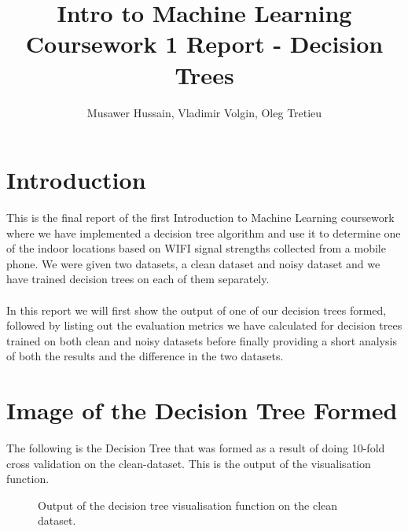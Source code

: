 \documentclass[a4paper, 11pt]{article}
\begin{document}
\title{Intro to Machine Learning Coursework 1 Report - Decision Trees}

\author{Musawer Hussain, Vladimir Volgin, Oleg Tretieu}

\maketitle

\section{Introduction}
This is the final report of the first Introduction to Machine Learning coursework where we have implemented a decision tree algorithm and use it to determine one of the indoor locations based on WIFI signal strengths collected from a mobile phone. We were given two datasets, a clean dataset and noisy dataset and we have trained decision trees on each of them separately.
\\ \\
In this report we will first show the output of one of our decision trees formed, followed by listing out the evaluation metrics we have calculated for decision trees trained on both clean and noisy datasets before finally providing a short analysis of both the results and the difference in the two datasets.

\section{Image of the Decision Tree Formed}

The following is the Decision Tree that was formed as a result of doing 10-fold cross validation on the clean-dataset. This is the output of the visualisation function.

\begin{figure}[h]
  \centering
  \caption{Output of the decision tree visualisation function on the clean dataset.}
\end{figure}
\end{document}
